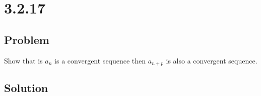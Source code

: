 \documentclass[12pt]{article}
\begin{document}
\section*{3.2.17}

\subsection*{Problem}
Show that is $a_n$ is a convergent sequence then $a_{n + p}$ is also a convergent sequence.

\subsection*{Solution}
\end{document}
